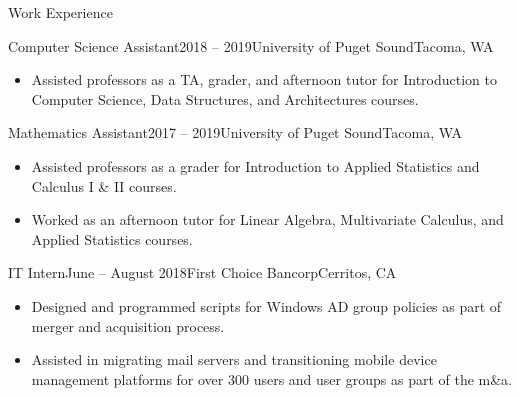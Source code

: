 \documentclass{resume} %
\begin{document}

\begin{rSection}{Work Experience}

\begin{rSubsection}{Computer Science Assistant}{2018 -- 2019}{University of Puget Sound}{Tacoma, WA}
\renewcommand\labelitemi{$\cdot$}
\begin{itemize}
\setlength\itemsep{-0.25em}
\item Assisted professors as a TA, grader, and afternoon tutor for Introduction to Computer Science, Data Structures, and Architectures courses. 
\end{itemize}
\end{rSubsection}


\begin{rSubsection}{Mathematics Assistant}{2017 -- 2019}{University of Puget Sound}{Tacoma, WA}
\renewcommand\labelitemi{$\cdot$}
\begin{itemize}
\setlength\itemsep{-0.25em}
\item Assisted professors as a grader for Introduction to Applied Statistics and Calculus I \& II courses.
\item Worked as an afternoon tutor for Linear Algebra, Multivariate Calculus, and Applied Statistics courses.
\end{itemize}
\end{rSubsection}


\begin{rSubsection}{IT Intern}{June -- August 2018}{First Choice Bancorp}{Cerritos, CA}
\renewcommand\labelitemi{$\cdot$}
\begin{itemize}
\setlength\itemsep{-0.25em}
\item Designed and programmed scripts for Windows AD group policies as part of merger and acquisition process.
\item Assisted in migrating mail servers and transitioning mobile device management platforms for over 300 users and user groups as part of the m\&a.
\end{itemize}
\end{rSubsection}


\end{rSection}
\end{document}
